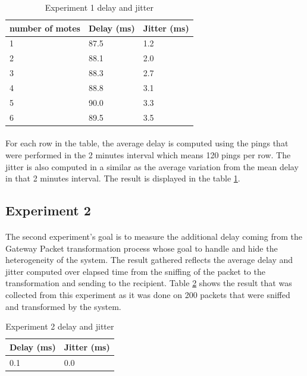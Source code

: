 \documentclass[oneside,12pt,a4paper,final]{book}
\begin{document}
\begin{table}[htbp]
    \begin{tabular}{lll}
    \hline
    number of motes & Delay (ms) & Jitter (ms) \\\hline
    1               & 87.5         & 1.2         \\ 
    2               & 88.1         & 2.0         \\
    3               & 88.3        & 2.7         \\
    4               & 88.8         & 3.1         \\
    5               & 90.0         & 3.3         \\
    6               & 89.5         & 3.5         \\
    \end{tabular}
    \caption{Experiment 1 delay and jitter}
    \label{table:exp1}
\end{table}
\paragraph{}
For each row in the table, the average delay is computed using the pings that were performed in the 2 minutes interval which means 120 pings per row. The jitter is also computed in a similar as the average variation from the mean delay in that 2 minutes interval. The result is displayed in the table \ref{table:exp1}. 

\subsection{Experiment 2}
\paragraph{}
The second experiment's goal is to measure the additional delay coming from the Gateway Packet transformation process whose goal to handle and hide the heterogeneity of the system. The result gathered reflects the average delay and jitter computed over elapsed time from the sniffing of the packet to the transformation and sending to the recipient. Table \ref{table:exp2} shows the result that was collected from this experiment as it was done on 200 packets that were sniffed and transformed by the system.

\begin{table}[htbp]
    \begin{tabular}{ll}
    \hline
    Delay (ms) & Jitter (ms) \\ \hline
    0.1        & 0.0         \\ 
    \end{tabular}
    \caption{Experiment 2 delay and jitter}
        \label{table:exp2}
\end{table}
\end{document}
